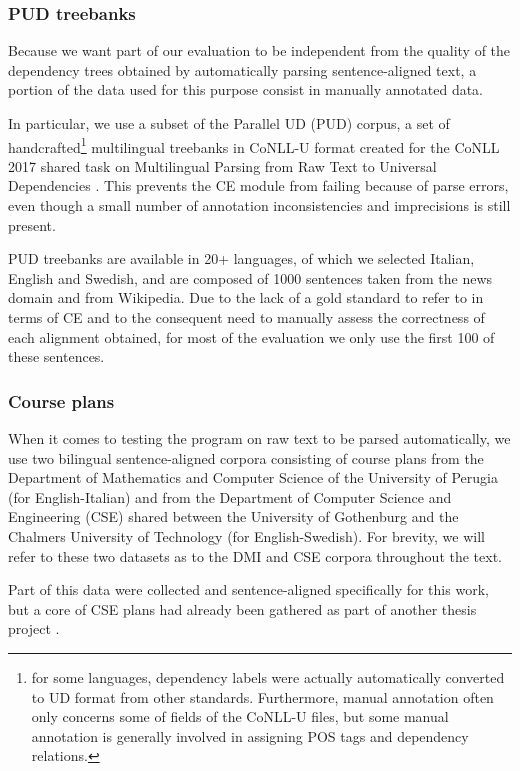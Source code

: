 \subsubsection{PUD treebanks}
Because we want part of our evaluation to be independent from the quality of the dependency trees obtained by automatically parsing sentence-aligned text, a portion of the data used for this purpose consist in manually annotated data. \smallskip

In particular, we use a subset of the Parallel UD (PUD) corpus, a set of handcrafted\footnote{for some languages, dependency labels were actually automatically converted to UD format from other standards. Furthermore, manual annotation often only concerns some of fields of the CoNLL-U files, but some manual annotation is generally involved in assigning POS tags and dependency relations.} multilingual treebanks in CoNLL-U format created for the CoNLL 2017 shared task on Multilingual Parsing from Raw Text to Universal Dependencies \cite{mprtud}. This prevents the CE module from failing because of parse errors, even though a small number of annotation inconsistencies and imprecisions is still present. \smallskip

PUD treebanks are available in 20+ languages, of which we selected Italian, English and Swedish, and are composed of 1000 sentences taken from the news domain and from Wikipedia. Due to the lack of a gold standard to refer to in terms of CE and to the consequent need to manually assess the correctness of each alignment obtained, for most of the evaluation we only use the first 100 of these sentences. \smallskip

\subsubsection{Course plans} \label{plans}
When it comes to testing the program on raw text to be parsed automatically, we use two bilingual sentence-aligned corpora consisting of course plans from the Department of Mathematics and Computer Science of the University of Perugia (for English-Italian) and from the Department of Computer Science and Engineering (CSE) shared between the University of Gothenburg and the Chalmers University of Technology (for English-Swedish). For brevity, we will refer to these two datasets as to the DMI and CSE corpora throughout the text.\smallskip

Part of this data were collected and sentence-aligned specifically for this work, but a core of CSE plans had already been gathered as part of another thesis project \cite{thesis}. \smallskip

